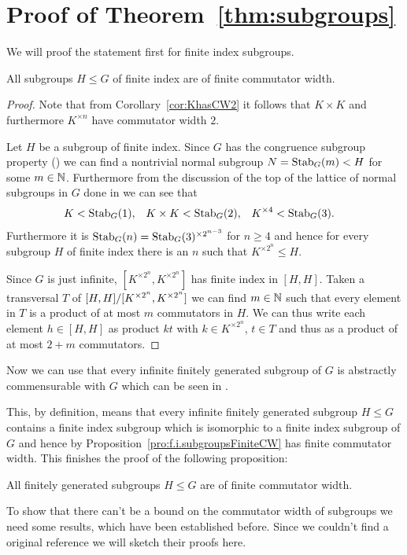 \documentclass[a4paper,11pt]{amsart}
\begin{document}
\section{Proof of Theorem~\ref{thm:subgroups}}
We will proof the statement first for finite index subgroups. 
\begin{pro}\label{pro:f.i.subgroupsFiniteCW}
  All subgroups $H \leq G$ of finite index are of finite commutator width.
\end{pro}
\begin{proof}
 Note that from Corollary~\ref{cor:KhasCW2} it follows that $K\times K$ and furthermore 
 $K^{\times n}$ have commutator width $2$. 
 
 Let $H$ be a subgroup of finite index. Since $G$ has the congruence subgroup property
 (\cite{Bartholdi:parabolicSubgroups}) we can find a nontrivial normal subgroup $N=\operatorname{Stab}_G(m)<H$
 for some $m\in\mathbb{N}$. Furthermore from the discussion of the top of the lattice of normal subgroups
 in $G$ done in \cite{Bartholdi:parabolicSubgroups} we can see that 
 \begin{align*}
  K&<\operatorname{Stab}_G(1), & K\times K&<\operatorname{Stab}_G(2), & K^{\times 4}&<\operatorname{Stab}_G(3).
 \end{align*}
 Furthermore it is $\operatorname{Stab}_G(n)=\operatorname{Stab}_G(3)^{\times 2^{n-3}}$ for $n\geq 4$ and hence for every 
 subgroup $H$ of finite index there is an $n$ such that $K^{\times 2^n}\leq H$.
  
  Since $G$ is just infinite, $[K^{\times2^n},K^{\times2^n}]$ has finite index in $[H,H]$.
  Taken a transversal $T$ of ${[H,H]/[K^{\times2^n},K^{\times2^n}]}$ we can find 
  $m\in \mathbb{N}$ such that every element in $T$ is a product of at most $m$ commutators in $H$.
  We can thus write each element $h\in [H,H]$ as product $kt$ with $k\in K^{\times 2^n}$, 
  $t\in T$ and thus as a product of at most $2+m$ commutators.  
\end{proof}
Now we can use that every infinite finitely generated subgroup of $G$ is 
abstractly commensurable with $G$ which can be seen in 
\cite[Theorem~1]{Grigorchuk-Wilson:Commensurability}.

This, by definition, means that every infinite finitely generated subgroup $H\leq G$ 
contains a finite index subgroup which is isomorphic to a finite index subgroup
of $G$ and hence by Proposition~\ref{pro:f.i.subgroupsFiniteCW} has finite
commutator width. This finishes the proof of the following proposition:
\begin{pro} \label{pro:fgsubgroupcw}
   All finitely generated subgroups $H \leq G$ are of finite commutator width.
\end{pro}
To show that there can't be a bound on the commutator width of subgroups
we need some results, which have
been established before. Since we couldn't find a original reference we will
sketch their proofs here.
\end{document}
